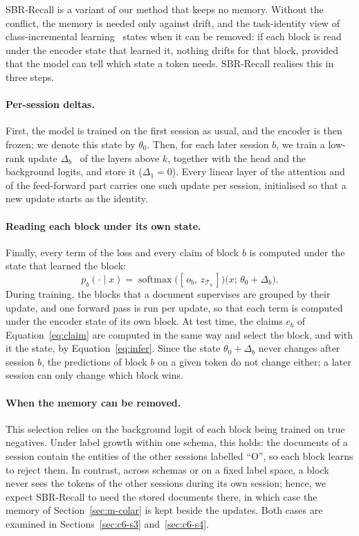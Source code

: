 SBR-Recall is a variant of our method that keeps no memory. Without the conflict, the memory
is needed only against drift, and the task-identity view of class-incremental
learning~\citep{kim2022theoretical} states when it can be removed: if each block is read
under the encoder state that learned it, nothing drifts for that block, provided that the
model can tell which state a token needs. SBR-Recall realises this in three steps.

\paragraph{Per-session deltas.} First, the model is trained on the first session as usual,
and the encoder is then frozen; we denote this state by $\theta_0$. Then, for each later
session $b$, we train a low-rank update $\Delta_b$~\citep{hu2022lora} of the layers above
$k$, together with the head and the background logits, and store it ($\Delta_1=0$). Every
linear layer of the attention and of the feed-forward part carries one such update per
session, initialised so that a new update starts as the identity.

\paragraph{Reading each block under its own state.} Finally, every term of the loss and
every claim of block $b$ is computed under the state that learned the block:
\begin{equation}
  p_b(\cdot\mid x)=\operatorname{softmax}\big([\,o_b,\,z_{\mathcal{T}_b}\,]\big)
  \big(x;\,\theta_0+\Delta_b\big).
  \label{eq:recall}
\end{equation}
During training, the blocks that a document supervises are grouped by their update, and one
forward pass is run per update, so that each term is computed under the encoder state of its
own block. At test time, the claims $e_b$ of Equation~\eqref{eq:claim} are computed in the
same way and select the block, and with it the state, by Equation~\eqref{eq:infer}. Since the
state $\theta_0+\Delta_b$ never changes after session $b$, the predictions of block $b$ on a
given token do not change either; a later session can only change which block wins.

\paragraph{When the memory can be removed.} This selection relies on the background logit of
each block being trained on true negatives. Under label growth within one schema, this
holds: the documents of a session contain the entities of the other sessions labelled ``O'',
so each block learns to reject them. In contrast, across schemas or on a fixed label space, a
block never sees the tokens of the other sessions during its own session; hence, we expect
SBR-Recall to need the stored documents there, in which case the memory of
Section~\ref{sec:m-colar} is kept beside the updates. Both cases are examined in
Sections~\ref{sec:c6-s3} and~\ref{sec:c6-s4}.

